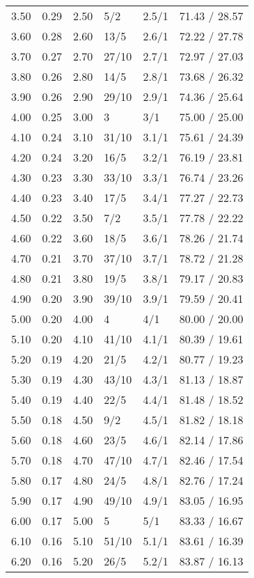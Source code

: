 \begin{longtable}{rrrlll}
  3.50 & 0.29 & 2.50 & 5/2 & 2.5/1 & 71.43 / 28.57 \\ 
  3.60 & 0.28 & 2.60 & 13/5 & 2.6/1 & 72.22 / 27.78 \\ 
  3.70 & 0.27 & 2.70 & 27/10 & 2.7/1 & 72.97 / 27.03 \\ 
  3.80 & 0.26 & 2.80 & 14/5 & 2.8/1 & 73.68 / 26.32 \\ 
  3.90 & 0.26 & 2.90 & 29/10 & 2.9/1 & 74.36 / 25.64 \\ 
  4.00 & 0.25 & 3.00 & 3 & 3/1 & 75.00 / 25.00 \\ 
  4.10 & 0.24 & 3.10 & 31/10 & 3.1/1 & 75.61 / 24.39 \\ 
  4.20 & 0.24 & 3.20 & 16/5 & 3.2/1 & 76.19 / 23.81 \\ 
  4.30 & 0.23 & 3.30 & 33/10 & 3.3/1 & 76.74 / 23.26 \\ 
  4.40 & 0.23 & 3.40 & 17/5 & 3.4/1 & 77.27 / 22.73 \\ 
  4.50 & 0.22 & 3.50 & 7/2 & 3.5/1 & 77.78 / 22.22 \\ 
  4.60 & 0.22 & 3.60 & 18/5 & 3.6/1 & 78.26 / 21.74 \\ 
  4.70 & 0.21 & 3.70 & 37/10 & 3.7/1 & 78.72 / 21.28 \\ 
  4.80 & 0.21 & 3.80 & 19/5 & 3.8/1 & 79.17 / 20.83 \\ 
  4.90 & 0.20 & 3.90 & 39/10 & 3.9/1 & 79.59 / 20.41 \\ 
  5.00 & 0.20 & 4.00 & 4 & 4/1 & 80.00 / 20.00 \\ 
  5.10 & 0.20 & 4.10 & 41/10 & 4.1/1 & 80.39 / 19.61 \\ 
  5.20 & 0.19 & 4.20 & 21/5 & 4.2/1 & 80.77 / 19.23 \\ 
  5.30 & 0.19 & 4.30 & 43/10 & 4.3/1 & 81.13 / 18.87 \\ 
  5.40 & 0.19 & 4.40 & 22/5 & 4.4/1 & 81.48 / 18.52 \\ 
  5.50 & 0.18 & 4.50 & 9/2 & 4.5/1 & 81.82 / 18.18 \\ 
  5.60 & 0.18 & 4.60 & 23/5 & 4.6/1 & 82.14 / 17.86 \\ 
  5.70 & 0.18 & 4.70 & 47/10 & 4.7/1 & 82.46 / 17.54 \\ 
  5.80 & 0.17 & 4.80 & 24/5 & 4.8/1 & 82.76 / 17.24 \\ 
  5.90 & 0.17 & 4.90 & 49/10 & 4.9/1 & 83.05 / 16.95 \\ 
  6.00 & 0.17 & 5.00 & 5 & 5/1 & 83.33 / 16.67 \\ 
  6.10 & 0.16 & 5.10 & 51/10 & 5.1/1 & 83.61 / 16.39 \\ 
  6.20 & 0.16 & 5.20 & 26/5 & 5.2/1 & 83.87 / 16.13 \\ 

\end{longtable}
